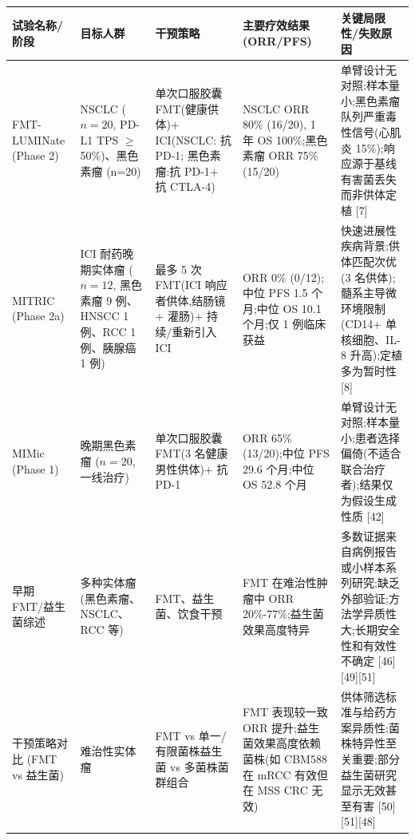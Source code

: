 {\def\LTcaptype{none} %
\begin{longtable}[]{@{}
  >{\raggedright\arraybackslash}p{}
  >{\raggedright\arraybackslash}p{}
  >{\raggedright\arraybackslash}p{}
  >{\raggedright\arraybackslash}p{}
  >{\raggedright\arraybackslash}p{}@{}}
\toprule\noalign{}
\begin{minipage}[b]{\linewidth}\raggedright
试验名称/阶段
\end{minipage} & \begin{minipage}[b]{\linewidth}\raggedright
目标人群
\end{minipage} & \begin{minipage}[b]{\linewidth}\raggedright
干预策略
\end{minipage} & \begin{minipage}[b]{\linewidth}\raggedright
主要疗效结果 (ORR/PFS)
\end{minipage} & \begin{minipage}[b]{\linewidth}\raggedright
关键局限性/失败原因
\end{minipage} \\
\midrule\noalign{}
\endhead
\bottomrule\noalign{}
\endlastfoot
FMT-LUMINate (Phase 2) & NSCLC (\(n=20\), PD-L1 TPS \(\geq\) 50\%)、黑色素瘤 (n=20) & 单次口服胶囊 FMT(健康供体)+ ICI(NSCLC: 抗 PD-1; 黑色素瘤:抗 PD-1+ 抗 CTLA-4) & NSCLC ORR 80\% (16/20), 1 年 OS 100\%;黑色素瘤 ORR 75\% (15/20) & 单臂设计无对照;样本量小;黑色素瘤队列严重毒性信号(心肌炎 15\%);响应源于基线有害菌丢失而非供体定植 {[}7{]} \\
MITRIC (Phase 2a) & ICI 耐药晚期实体瘤 (\(n=12\), 黑色素瘤 9 例、HNSCC 1 例、RCC 1 例、胰腺癌 1 例) & 最多 5 次 FMT(ICI 响应者供体,结肠镜 + 灌肠)+ 持续/重新引入 ICI & ORR 0\% (0/12);中位 PFS 1.5 个月;中位 OS 10.1 个月;仅 1 例临床获益 & 快速进展性疾病背景;供体匹配次优(3 名供体);髓系主导微环境限制(CD14+ 单核细胞、IL-8 升高);定植多为暂时性 {[}8{]} \\
MIMic (Phase 1) & 晚期黑色素瘤 (\(n=20\), 一线治疗) & 单次口服胶囊 FMT(3 名健康男性供体)+ 抗 PD-1 & ORR 65\% (13/20);中位 PFS 29.6 个月;中位 OS 52.8 个月 & 单臂设计无对照;样本量小;患者选择偏倚(不适合联合治疗者);结果仅为假设生成性质 {[}42{]} \\
早期 FMT/益生菌综述 & 多种实体瘤(黑色素瘤、NSCLC、RCC 等) & FMT、益生菌、饮食干预 & FMT 在难治性肿瘤中 ORR 20\%-77\%;益生菌效果高度特异 & 多数证据来自病例报告或小样本系列研究;缺乏外部验证;方法学异质性大;长期安全性和有效性不确定 {[}46{]}{[}49{]}{[}51{]} \\
干预策略对比 (FMT vs 益生菌) & 难治性实体瘤 & FMT vs 单一/有限菌株益生菌 vs 多菌株菌群组合 & FMT 表现较一致 ORR 提升;益生菌效果高度依赖菌株(如 CBM588 在 mRCC 有效但在 MSS CRC 无效) & 供体筛选标准与给药方案异质性;菌株特异性至关重要;部分益生菌研究显示无效甚至有害 {[}50{]}{[}51{]}{[}48{]} \\
\end{longtable}
}

